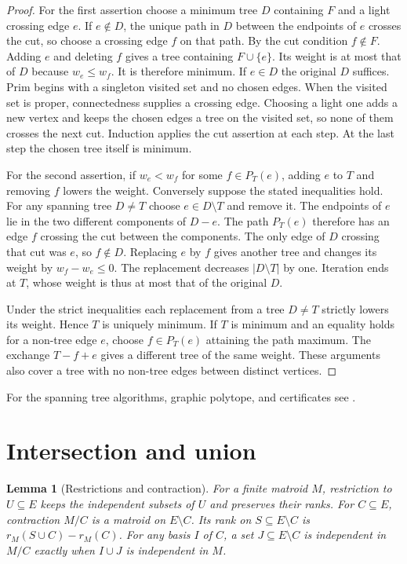 \documentclass[11pt,oneside,openany]{book}
\theoremstyle{plain}
\newtheorem{lemma}[theorem]{Lemma}
\theoremstyle{definition}
\theoremstyle{remark}
\begin{document}
\begin{proof}
For the first assertion choose a minimum tree \(D\) containing \(F\)
and a light crossing edge \(e\). If \(e\notin D\), the unique path
in \(D\) between the endpoints of \(e\) crosses the cut, so choose
a crossing edge \(f\) on that path. By the cut condition \(f\notin F\).
Adding \(e\) and deleting \(f\) gives a tree containing \(F\cup\{e\}\).
Its weight is at most that of \(D\) because \(w_e\le w_f\).
It is therefore minimum. If \(e\in D\) the original \(D\) suffices.
Prim begins with a singleton visited set and no chosen edges.
When the visited set is proper, connectedness supplies a crossing
edge. Choosing a light one adds a new vertex and keeps the chosen
edges a tree on the visited set, so none of them crosses the next
cut. Induction applies the cut assertion at each step. At the
last step the chosen tree itself is minimum.

For the second assertion, if \(w_e<w_f\) for some \(f\in P_T(e)\),
adding \(e\) to \(T\) and removing \(f\) lowers the weight. Conversely
suppose the stated inequalities hold. For any spanning tree \(D\ne T\)
choose \(e\in D\setminus T\) and remove it. The endpoints of \(e\)
lie in the two different components of \(D-e\). The path \(P_T(e)\)
therefore has an edge \(f\) crossing the cut between the components.
The only edge of \(D\) crossing that cut was \(e\), so \(f\notin D\).
Replacing \(e\) by \(f\) gives another tree and changes its weight
by \(w_f-w_e\le0\). The replacement decreases \(|D\setminus T|\)
by one. Iteration ends at \(T\), whose weight is thus at most
that of the original \(D\).

Under the strict inequalities each replacement from a tree
\(D\ne T\) strictly lowers its weight. Hence \(T\) is uniquely
minimum. If \(T\) is minimum and an equality holds for a non-tree
edge \(e\), choose \(f\in P_T(e)\) attaining the path maximum.
The exchange \(T-f+e\) gives a different tree of the same
weight. These arguments also cover a tree with no non-tree edges
between distinct vertices.
\end{proof}

For the spanning tree algorithms, graphic polytope, and certificates
see \cite[Sections~50.1--50.4 and 50.6]{schrijver}.

\section{Intersection and union}

\begin{lemma}[Restrictions and contraction]
\label{p205:matroid-minors}
For a finite matroid \(M\), restriction to \(U\subseteq E\) keeps
the independent subsets of \(U\) and preserves their ranks.
For \(C\subseteq E\), contraction \(M/C\) is a matroid on
\(E\setminus C\). Its rank on \(S\subseteq E\setminus C\) is
\(r_M(S\cup C)-r_M(C)\). For any basis \(I\) of \(C\), a set
\(J\subseteq E\setminus C\) is independent in \(M/C\) exactly
when \(I\cup J\) is independent in \(M\).
\end{lemma}
\end{document}
